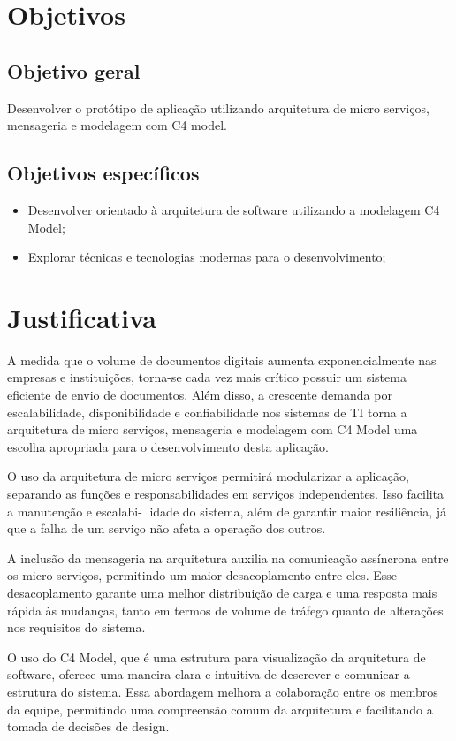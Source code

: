 \section{Objetivos}

\subsection{Objetivo geral}
Desenvolver o protótipo de aplicação utilizando arquitetura de micro serviços, mensageria
e modelagem com C4 model.

\subsection{Objetivos específicos}
\begin{itemize}
    \item Desenvolver orientado à arquitetura de software utilizando a modelagem C4 Model;
    \item Explorar técnicas e tecnologias modernas para o desenvolvimento;
\end{itemize}

\section{Justificativa}
A medida que o volume de documentos digitais aumenta exponencialmente nas empresas
e instituições, torna-se cada vez mais crítico possuir um sistema eficiente de envio de documentos.
Além disso, a crescente demanda por escalabilidade, disponibilidade e confiabilidade nos sistemas
de TI torna a arquitetura de micro serviços, mensageria e modelagem com C4 Model uma escolha
apropriada para o desenvolvimento desta aplicação.

O uso da arquitetura de micro serviços permitirá modularizar a aplicação, separando as
funções e responsabilidades em serviços independentes. Isso facilita a manutenção e escalabi-
lidade do sistema, além de garantir maior resiliência, já que a falha de um serviço não afeta a
operação dos outros.

A inclusão da mensageria na arquitetura auxilia na comunicação assíncrona entre os
micro serviços, permitindo um maior desacoplamento entre eles. Esse desacoplamento garante
uma melhor distribuição de carga e uma resposta mais rápida às mudanças, tanto em termos de
volume de tráfego quanto de alterações nos requisitos do sistema.

O uso do C4 Model, que é uma estrutura para visualização da arquitetura de software,
oferece uma maneira clara e intuitiva de descrever e comunicar a estrutura do sistema. Essa
abordagem melhora a colaboração entre os membros da equipe, permitindo uma compreensão
comum da arquitetura e facilitando a tomada de decisões de design.

